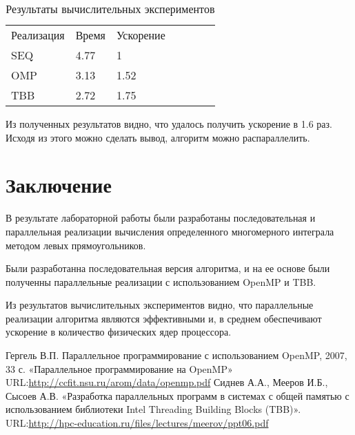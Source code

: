 \documentclass{report}
\begin{document}
 \begin{table}[!h]
 \begin{center}
 \begin{tabular}{lllllll}
 Реализация & Время & Ускорение   \\
 SEQ        & 4.77 & 1           \\
 OMP        & 3.13 & 1.52       \\
 TBB        & 2.72 & 1.75       \\

 \end{tabular}
 \end{center}
 \caption{Результаты вычислительных экспериментов}
 \centering
 \end{table}

 \par Из полученных результатов видно, что удалось получить ускорение в 1.6 раз. Исходя из этого можно сделать вывод, алгоритм можно распараллелить.
 \newpage

 \section*{Заключение}
 В результате лабораторной работы были разработаны последовательная и параллельная реализации вычисления определенного многомерного интеграла методом левых прямоугольников.
 \par Были разработанна последовательная версия алгоритма, и на ее основе были полученны параллельные реализации с использованием OpenMP и TBB. 
 \par Из результатов вычислительных экспериментов видно, что параллельные реализации алгоритма являются эффективными и, в среднем обеспечивают ускорение в количество физических ядер процессора.
 \newpage

 \begin{thebibliography}{1}
  Гергель В.П. Параллельное программирование с использованием
 OpenMP, 2007, 33 с.
 \bibitem{} «Параллельное программирование на OpenMP»
 \\URL:\url {http://ccfit.nsu.ru/arom/data/openmp.pdf}
  Сиднев А.А., Мееров И.Б., Сысоев А.В. «Разработка параллельных программ в системах с общей памятью с использованием библиотеки Intel Threading Building Blocks (TBB)».
 \\URL:\url {http://hpc-education.ru/files/lectures/meerov/ppt06.pdf}
 \end{thebibliography}
 \newpage
\end{document}
